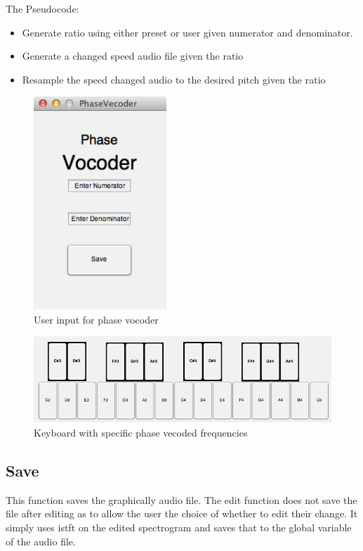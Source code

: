 \documentclass[12pt]{article}
\begin{document}
				The Pseudocode:

				\begin{itemize}
					\item Generate ratio using either preset or user given numerator and denominator.
					\item Generate a changed speed audio file given the ratio 
					\item Resample the speed changed audio to the desired pitch given the ratio  
				\end{itemize}

				\begin{figure}[h!]
  					\centering
            				\includegraphics[width=5cm]{PhaseUserInput.png}
	      				\caption{User input for phase vocoder}
				\end{figure}
				\begin{figure}[h!]
					\centering
					\includegraphics[width=14cm]{Keyboard.png}
					\caption{Keyboard with specific phase vecoded frequencies}
				\end{figure}

			\subsection{Save}

				This function saves the graphically audio file. The edit function does not save the file after editing as to allow the user the choice of whether to edit their change. It simply uses istft on the edited spectrogram and saves that to the global variable of the audio file.  
\end{document}
